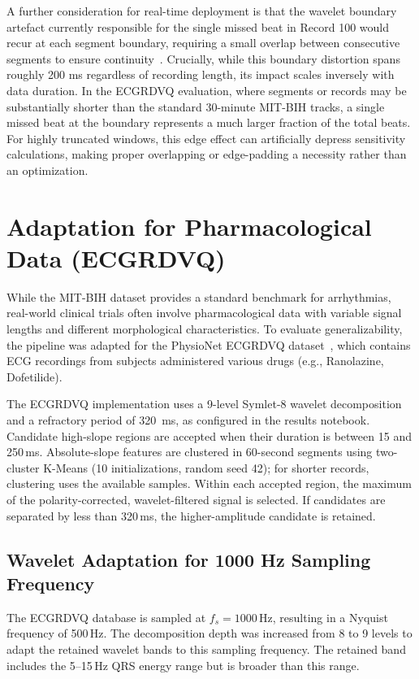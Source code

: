 \documentclass[11pt]{article}
\begin{document}
A further consideration for real-time deployment is that the wavelet boundary artefact currently responsible for the single missed beat in Record 100 would recur at each segment boundary, requiring a small overlap between consecutive segments to ensure continuity~\cite{lin_discrete-wavelet-transform-based_2014}. Crucially, while this boundary distortion spans roughly 200 ms regardless of recording length, its impact scales inversely with data duration. In the ECGRDVQ evaluation, where segments or records may be substantially shorter than the standard 30-minute MIT-BIH tracks, a single missed beat at the boundary represents a much larger fraction of the total beats. For highly truncated windows, this edge effect can artificially depress sensitivity calculations, making proper overlapping or edge-padding a necessity rather than an optimization.


\section{Adaptation for Pharmacological Data (ECGRDVQ)}\label{sec:ecgrdvq}
While the MIT-BIH dataset provides a standard benchmark for arrhythmias, real-world clinical trials often involve pharmacological data with variable signal lengths and different morphological characteristics. To evaluate generalizability, the pipeline was adapted for the PhysioNet ECGRDVQ dataset~\cite{physionet_ecgrdvq}, which contains ECG recordings from subjects administered various drugs (e.g., Ranolazine, Dofetilide). 

The ECGRDVQ implementation uses a 9-level Symlet-8 wavelet decomposition and a refractory period of \SI{320}{ms}, as configured in the results notebook. Candidate high-slope regions are accepted when their duration is between 15 and 250\,ms. Absolute-slope features are clustered in 60-second segments using two-cluster K-Means (10 initializations, random seed 42); for shorter records, clustering uses the available samples. Within each accepted region, the maximum of the polarity-corrected, wavelet-filtered signal is selected. If candidates are separated by less than 320\,ms, the higher-amplitude candidate is retained.


\subsection{Wavelet Adaptation for 1000 Hz Sampling Frequency}
The ECGRDVQ database is sampled at $f_s = 1000$\,Hz, resulting in a Nyquist frequency of 500\,Hz. The decomposition depth was increased from 8 to 9 levels to adapt the retained wavelet bands to this sampling frequency. The retained band includes the 5--15\,Hz QRS energy range but is broader than this range.
\end{document}
